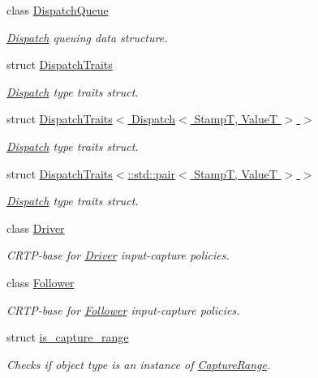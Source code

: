 \begin{DoxyCompactItemize}
class \hyperlink{classflow_1_1_dispatch_queue}{Dispatch\+Queue}
\begin{DoxyCompactList}\small\item\em \hyperlink{classflow_1_1_dispatch}{Dispatch} queuing data structure. \end{DoxyCompactList}\item 
struct \hyperlink{structflow_1_1_dispatch_traits}{Dispatch\+Traits}
\begin{DoxyCompactList}\small\item\em \hyperlink{classflow_1_1_dispatch}{Dispatch} type traits struct. \end{DoxyCompactList}\item 
struct \hyperlink{structflow_1_1_dispatch_traits_3_01_dispatch_3_01_stamp_t_00_01_value_t_01_4_01_4}{Dispatch\+Traits$<$ Dispatch$<$ Stamp\+T, Value\+T $>$ $>$}
\begin{DoxyCompactList}\small\item\em \hyperlink{classflow_1_1_dispatch}{Dispatch} type traits struct. \end{DoxyCompactList}\item 
struct \hyperlink{structflow_1_1_dispatch_traits_3_1_1std_1_1pair_3_01_stamp_t_00_01_value_t_01_4_01_4}{Dispatch\+Traits$<$\+::std\+::pair$<$ Stamp\+T, Value\+T $>$ $>$}
\begin{DoxyCompactList}\small\item\em \hyperlink{classflow_1_1_dispatch}{Dispatch} type traits struct. \end{DoxyCompactList}\item 
class \hyperlink{classflow_1_1_driver}{Driver}
\begin{DoxyCompactList}\small\item\em C\+R\+T\+P-\/base for \hyperlink{classflow_1_1_driver}{Driver} input-\/capture policies. \end{DoxyCompactList}\item 
class \hyperlink{classflow_1_1_follower}{Follower}
\begin{DoxyCompactList}\small\item\em C\+R\+T\+P-\/base for \hyperlink{classflow_1_1_follower}{Follower} input-\/capture policies. \end{DoxyCompactList}\item 
struct \hyperlink{structflow_1_1is__capture__range}{is\+\_\+capture\+\_\+range}
\begin{DoxyCompactList}\small\item\em Checks if object type is an instance of \hyperlink{structflow_1_1_capture_range}{Capture\+Range}. \end{DoxyCompactList}\item 

\end{DoxyCompactItemize}
